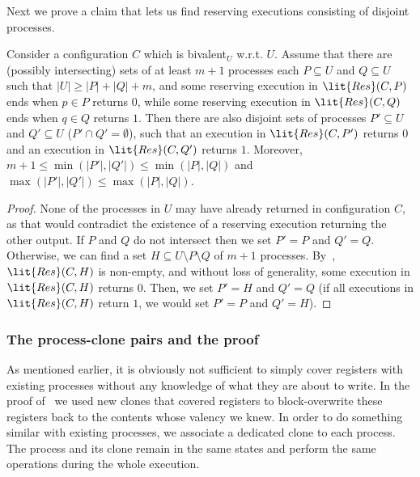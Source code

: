 Next we prove a claim that lets us find reserving executions consisting of disjoint processes. 
\begin{claim}
\label{clm:disjoint}
Consider a configuration $C$ which is bivalent$_U$ w.r.t. $U$.
Assume that there are (possibly intersecting) sets of at least $m+1$ processes each $P \subseteq U$ and $Q \subseteq U$ 
  such that $|U| \geq |P| + |Q| + m$,
  and some reserving execution in $\lit{Res}(C, P)$ ends when $p \in P$ returns $0$,
  while some reserving execution in $\lit{Res}(C, Q)$ ends when $q \in Q$ returns $1$.
Then there are also disjoint sets of processes $P' \subseteq U$ and $Q' \subseteq U$ ($P' \cap Q' = \emptyset$), 
  such that an execution in $\lit{Res}(C, P')$ returns $0$ and an execution in $\lit{Res}(C, Q')$ returns $1$. 
Moreover, $m+1 \leq \min(|P'|, |Q'|) \leq \min(|P|, |Q|)$ and $\max(|P'|, |Q'|) \leq \max(|P|, |Q|)$. 
\end{claim}
\begin{proof}
None of the processes in $U$ may have already returned in configuration $C$,
  as that would contradict the existence of a reserving execution returning the other output. 
If $P$ and $Q$ do not intersect then we set $P' = P$ and $Q' = Q$.
Otherwise, we can find a set $H \subseteq U \setminus P \setminus Q$ of $m+1$ processes.
By~, $\lit{Res}(C, H)$ is non-empty, 
  and without loss of generality, some execution in $\lit{Res}(C, H)$ returns $0$.
Then, we set $P' = H$ and $Q' = Q$ (if all executions in $\lit{Res}(C, H)$ return $1$, we would set $P' = P$ and $Q' = H$).
\end{proof}
\subsubsection{The process-clone pairs and the proof}
As mentioned earlier, it is obviously not sufficient to simply cover registers with existing processes
  without any knowledge of what they are about to write.
In the proof of~ we used new clones that covered registers to block-overwrite these registers 
  back to the contents whose valency we knew.
In order to do something similar with existing processes, we associate a dedicated clone to each process.
The process and its clone remain in the same states and perform the same operations during the whole execution.

